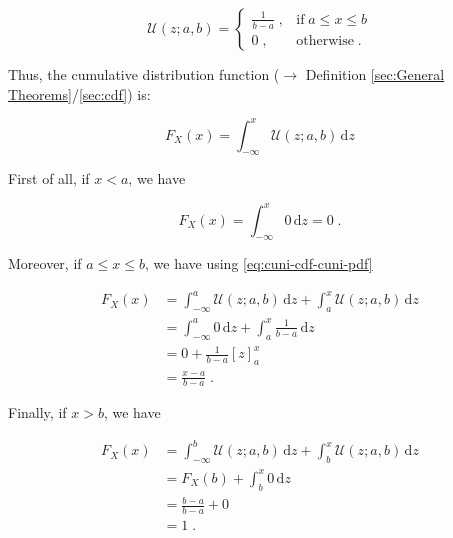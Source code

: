 \documentclass[a4paper,12pt]{book}
\begin{document}
\begin{equation} \label{eq:cuni-cdf-cuni-pdf}
\mathcal{U}(z; a, b) = \left\{
\begin{array}{rl}
\frac{1}{b-a} \; , & \text{if} \; a \leq x \leq b \\
0 \; , & \text{otherwise} \; .
\end{array}
\right.
\end{equation}

Thus, the cumulative distribution function ($\rightarrow$ Definition \ref{sec:General Theorems}/\ref{sec:cdf}) is:

\begin{equation} \label{eq:cuni-cdf-cuni-cdf-s1}
F_X(x) = \int_{-\infty}^{x} \mathcal{U}(z; a, b) \, \mathrm{d}z
\end{equation}

First of all, if $x < a$, we have

\begin{equation} \label{eq:cuni-cdf-cuni-cdf-s2a}
F_X(x) = \int_{-\infty}^{x} 0 \, \mathrm{d}z = 0 \; .
\end{equation}

Moreover, if $a \leq x \leq b$, we have using \eqref{eq:cuni-cdf-cuni-pdf}

\begin{equation} \label{eq:cuni-cdf-cuni-cdf-s2b}
\begin{split}
F_X(x) &= \int_{-\infty}^{a} \mathcal{U}(z; a, b) \, \mathrm{d}z + \int_{a}^{x} \mathcal{U}(z; a, b) \, \mathrm{d}z \\
&= \int_{-\infty}^{a} 0 \, \mathrm{d}z + \int_{a}^{x} \frac{1}{b-a} \, \mathrm{d}z \\
&= 0 + \frac{1}{b-a} [z]_a^x \\
&= \frac{x-a}{b-a} \; .
\end{split}
\end{equation}

Finally, if $x > b$, we have

\begin{equation} \label{eq:cuni-cdf-cuni-cdf-s2c}
\begin{split}
F_X(x) &= \int_{-\infty}^{b} \mathcal{U}(z; a, b) \, \mathrm{d}z + \int_{b}^{x} \mathcal{U}(z; a, b) \, \mathrm{d}z \\
&= F_X(b) + \int_{b}^{x} 0 \, \mathrm{d}z \\
&= \frac{b-a}{b-a} + 0 \\
&= 1 \; .
\end{split}
\end{equation}
\end{document}
